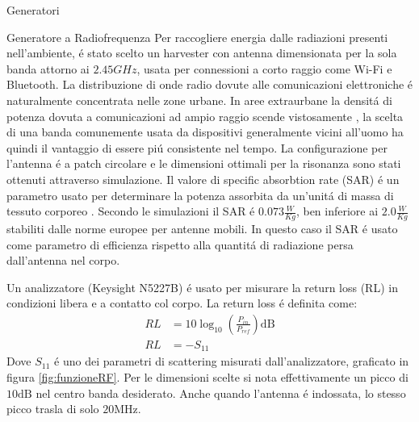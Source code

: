 \begin{section}{Generatori}
    \begin{subsection}{Generatore a Radiofrequenza}
        Per raccogliere energia dalle radiazioni presenti nell'ambiente, \'e stato scelto un harvester con antenna dimensionata per la sola banda attorno ai \(2.45GHz\), usata per connessioni a corto raggio come Wi-Fi e Bluetooth. La distribuzione di onde radio dovute alle comunicazioni elettroniche \'e naturalmente concentrata nelle zone urbane. In aree extraurbane la densit\'a di potenza dovuta a comunicazioni ad ampio raggio scende vistosamente \cite{ibrahimRadioFrequencyEnergy2022}, la scelta di una banda comunemente usata da dispositivi generalmente vicini all'uomo ha quindi il vantaggio di essere pi\'u consistente nel tempo. La configurazione per l'antenna \'e a patch circolare e le dimensioni ottimali per la risonanza sono stati ottenuti attraverso simulazione. Il valore di specific absorbtion rate (SAR) \'e un parametro usato per determinare la potenza assorbita da un'unit\'a di massa di tessuto corporeo \cite{vallozzi26LatestDevelopments2016}. Secondo le simulazioni il SAR \'e \(0.073\frac{W}{Kg}\), ben inferiore ai \(2.0\frac{W}{Kg}\) stabiliti dalle norme europee per antenne mobili. In questo caso il SAR \'e usato come parametro di efficienza rispetto alla quantit\'a di radiazione persa dall'antenna nel corpo. 


        
        Un analizzatore (Keysight N5227B) \'e usato per misurare la return loss (RL) in condizioni libera e a contatto col corpo. 
        La return loss \'e definita come:
        \begin{equation*}
            \begin{aligned}
            RL&=10\log_{10}\left( \frac{P_{in}}{P_{ref}} \right) \mathrm{dB}\\
            RL&=-S_{11}
            \end{aligned}
        \end{equation*}
        Dove \(S_{11}\) \'e uno dei parametri di scattering misurati dall'analizzatore, graficato in figura \ref{fig:funzioneRF}. Per le dimensioni scelte si nota effettivamente un picco di \(10\mathrm{dB}\) nel centro banda desiderato. Anche quando l'antenna \'e indossata, lo stesso picco trasla di solo \(20\mathrm{MHz}\).
        


\end{subsection}
\end{section}
